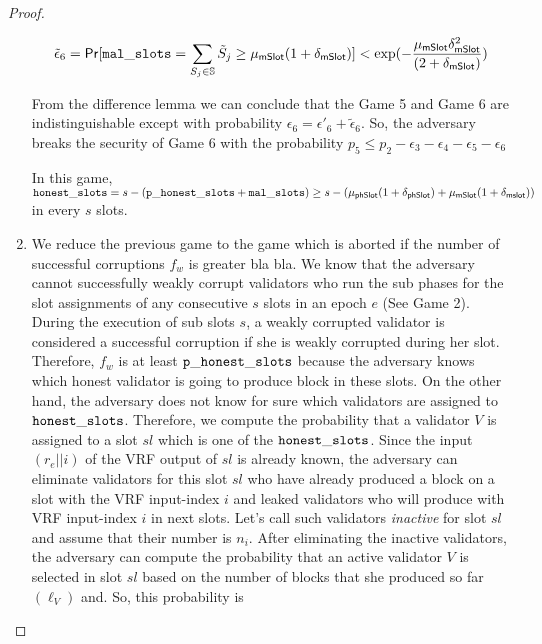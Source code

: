 \begin{proof}
\begin{enumerate}[label={{Game }}{{\arabic*}}]
	 \begin{equation}\label{eq:malvrf}
	 \tilde{\epsilon}_6 = \mathsf{Pr}[\mathtt{mal\_slots} = \sum_{S_j \in \mathbb{S}} \tilde{S}_{j} \geq \mu_{\mathsf{mSlot}} (1+ \delta_{\mathsf{mSlot}})] < \exp(-\frac{\mu_{\mathsf{mSlot}}\delta_{\mathsf{mSlot}}^2}{(2+\delta_{\mathsf{mSlot}})}) \nonumber
	 \end{equation}   
	
	From the difference lemma we can conclude that the Game 5 and Game 6 are indistinguishable except with probability $ \epsilon_6 = \epsilon'_6  + \tilde{\epsilon}_6 $. So, the adversary breaks the security of Game 6 with the probability $ p_5 \leq p_2 - \epsilon_3  - \epsilon_4 - \epsilon_5 - \epsilon_6$   
	 
	 In this game, $ \mathtt{honest\_slots} = s - (\mathtt{p\_honest\_slots} + \mathtt{mal\_slots}) \geq s - (\mu_{\mathsf{phSlot}}(1+\delta_{\mathsf{phSlot}})+ \mu_{\mathsf{mSlot}}(1+\delta_{\mathsf{mslot}})) $ in every $ s $ slots.
	 \item We reduce the previous game to the game which is aborted if the number of successful corruptions $ f_w $ is greater bla bla. We know that the adversary cannot successfully weakly corrupt validators who run the sub phases for the slot assignments of any consecutive $ s $ slots in an epoch $ e $ (See Game 2). During the execution of sub slots $ s $, a weakly corrupted validator is considered a successful corruption if she is weakly corrupted during her slot. Therefore, $ f_w $ is at least $ \mathtt{p\_honest\_slots} $ because the adversary knows which honest validator is going to produce block in these slots. On the other hand, the adversary does not know for sure which validators are assigned to $ \mathtt{honest\_slots} $. Therefore, we compute the probability that a validator $ V $ is assigned to a slot $ sl $ which is one of the $ \mathtt{honest\_slots} $.
	 Since the input $ (r_e||i) $ of the VRF output of $ sl $ is already known, the adversary can eliminate validators for this slot $ sl $ who have already produced a block on a slot with the VRF input-index $ i $ and leaked validators who will produce with VRF input-index $ i $ in next slots. Let's call such validators \emph{inactive} for slot $ sl $ and assume that their number is $ n_i $. After eliminating the inactive validators, the adversary can compute the probability that an active validator $ V $ is selected in slot $ sl $ based on the number of blocks that she produced so far $ (\ell_V) $ and. So, this probability is
	 
	 

\end{enumerate}
\end{proof}
